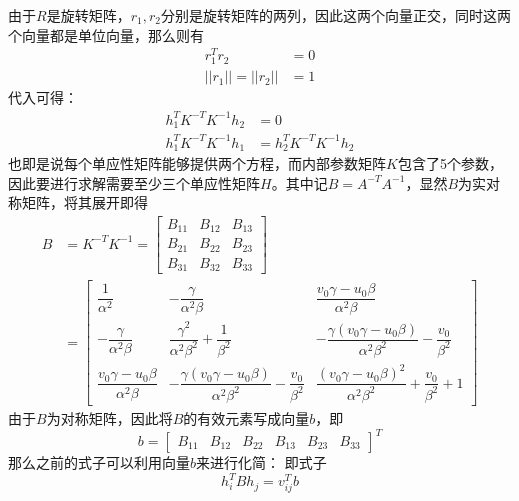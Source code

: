 由于\(R\)是旋转矩阵，\(r_1, r_2\)分别是旋转矩阵的两列，因此这两个向量正交，同时这两个向量都是单位向量，那么则有
\begin{align}
    r_1^Tr_2        & =0 \\
    ||r_1||=||r_2|| & =1
\end{align}
代入可得：
\begin{align}
    h_1^TK^{-T}K^{-1}h_2 & =0                     \\
    h_1^TK^{-T}K^{-1}h_1 & = h_2^TK^{-T}K^{-1}h_2
\end{align}
也即是说每个单应性矩阵能够提供两个方程，而内部参数矩阵\(K\)包含了5个参数，因此要进行求解需要至少三个单应性矩阵\(H\)。其中记\(B = A^{-T}A^{-1}\)，显然\(B\)为实对称矩阵，将其展开即得
\begin{align}
    B & =K^{-T}K^{-1}=
    \left[
        \begin{array}{ccc}
            B_{11} & B_{12} & B_{13} \\
            B_{21} & B_{22} & B_{23} \\
            B_{31} & B_{32} & B_{33}
        \end{array}
        \right]        \\ &=
    \left[
        \begin{array}{ccc}
            \dfrac{1}{\alpha^2}                       & -\dfrac{\gamma}{\alpha^2\beta}                                            & \dfrac{v_0\gamma-u_0\beta}{\alpha^2\beta}                                 \\
            -\dfrac{\gamma}{\alpha^2\beta}            & \dfrac{\gamma^2}{\alpha^2\beta^2}+\dfrac{1}{\beta^2}                      & -\dfrac{\gamma(v_0\gamma-u_0\beta)}{\alpha^2\beta^2}-\dfrac{v_0}{\beta^2} \\
            \dfrac{v_0\gamma-u_0\beta}{\alpha^2\beta} & -\dfrac{\gamma(v_0\gamma-u_0\beta)}{\alpha^2\beta^2}-\dfrac{v_0}{\beta^2} & \dfrac{(v_0\gamma-u_0\beta)^2}{\alpha^2\beta^2}+\dfrac{v_0}{\beta^2}+1
        \end{array}
        \right]
\end{align}
由于\(B\)为对称矩阵，因此将\(B\)的有效元素写成向量\(b\)，即
\begin{equation}
    b=\left[ \begin{array}{cccccc} B_{11} & B_{12} & B_{22} & B_{13} & B_{23} & B_{33} \end{array} \right]^T
\end{equation}
那么之前的式子可以利用向量\(b\)来进行化简：
即式子
\begin{equation}
    h_i^TBh_j = v^T_{ij}b
\end{equation}
